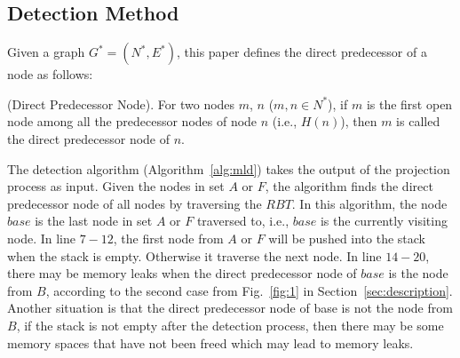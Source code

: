 \subsection{Detection Method}

Given a graph $G^*=(N^*, E^*)$, this paper defines the direct predecessor of a node as follows:

\begin{definition}{(Direct Predecessor Node).}
For two nodes $m$, $n$ ($m, n\in N^*$), if $m$ is the first open node among all the predecessor nodes of node $n$ (i.e., $Η(n)$), then $m$ is called the direct predecessor node of $n$.
\end{definition}

The detection algorithm (Algorithm~\ref{alg:mld}) takes the output of the projection process as input. %
Given the nodes in set $A$ or $F$, the algorithm finds the direct predecessor node of all nodes by traversing the $RBT$. In this algorithm, the node $base$ is the last node in set $A$ or $F$ traversed to, i.e., $base$ is the currently visiting node. In line $7-12$, the first node from $A$ or $F$ will be pushed into the stack when the stack is empty. Otherwise it traverse the next node. In line $14-20$, there may be memory leaks when the direct predecessor node of $base$ is the node from $B$, according to the second case from Fig.~\ref{fig:1} in Section~\ref{sec:description}. Another situation is that the direct predecessor node of base is not the node from $B$, if the stack is not empty after the detection process, then there may be some memory spaces that have not been freed which may lead to memory leaks.

